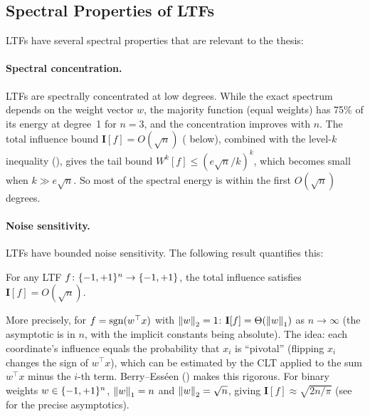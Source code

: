\subsection{Spectral Properties of LTFs}\label{sec:ltf-spectrum}

LTFs have several spectral properties that are relevant to the thesis:

\paragraph{Spectral concentration.}
LTFs are spectrally concentrated at low degrees. While the exact spectrum
depends on the weight vector $w$, the majority function (equal weights)
has 75\% of its energy at degree~1 for $n = 3$, and the concentration
improves with $n$. The total influence bound $\mathbf{I}[f] = O(\sqrt{n})$
( below), combined with the level-$k$ inequality
(), gives the tail bound
$W^k[f] \leq (e\sqrt{n}/k)^k$, which becomes small when
$k \gg e\sqrt{n}$. So most of the spectral energy is within the first
$O(\sqrt{n})$ degrees.

\paragraph{Noise sensitivity.}
LTFs have bounded noise sensitivity. The following result quantifies this:

\begin{theorem}\label{thm:ltf-noise}
For any LTF $f \colon \{-1,+1\}^n \to \{-1,+1\}$, the total influence satisfies
$\mathbf{I}[f] = O(\sqrt{n})$.
\end{theorem}

More precisely, for $f = \operatorname{sgn}(w^\top x)$ with
$\left\| w \right\|_2 = 1$: $\mathbf{I}[f] = \Theta(\left\| w \right\|_1)$ as
$n \to \infty$ (the asymptotic is in $n$, with the implicit constants
being absolute). The idea: each coordinate's influence equals the
probability that $x_i$ is ``pivotal'' (flipping $x_i$ changes the sign
of $w^\top x$), which can be estimated by the CLT applied to the sum
$w^\top x$ minus the $i$-th term. Berry--Ess\'een
() makes this rigorous. For binary weights
$w \in \{-1,+1\}^n$, $\left\| w \right\|_1 = n$ and $\left\| w \right\|_2 = \sqrt{n}$, giving
$\mathbf{I}[f] \approx \sqrt{2n/\pi}$
(see \citealp{peres2004noise} for the precise asymptotics).


